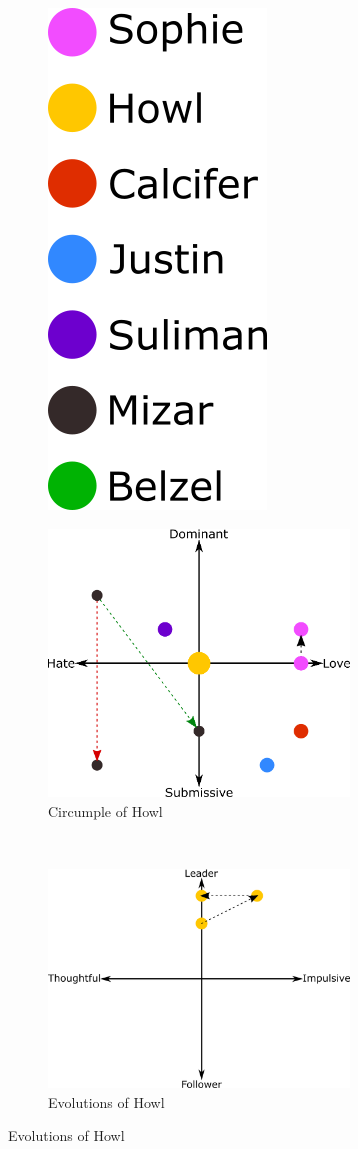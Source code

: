 \begin{figure}
\centering
\begin{subfigure}
  \centering
  \includegraphics[scale=0.3]{Images/charactersColors}
\end{subfigure}
\begin{subfigure}
  \centering
  \includegraphics[width=8cm]{Images/Circumplexes/howlCircumplex}
  \caption{Circumple of Howl}
\end{subfigure}\\
\begin{subfigure}
  \centering
   \includegraphics[width=8cm]{Images/Evolutions/howlEvolution}
  \caption{Evolutions of Howl}
\end{subfigure}
\end{figure}


